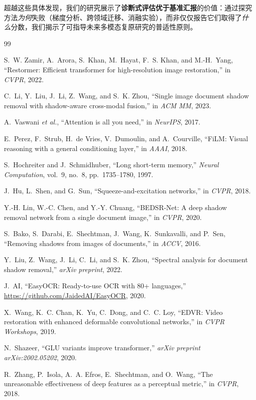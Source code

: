 \documentclass[11pt]{ctexart}
\begin{document}
超越这些具体发现，我们的研究展示了\textbf{诊断式评估优于基准汇报}的价值：通过探究方法\textit{为何}失败（梯度分析、跨领域迁移、消融实验），而非仅仅报告它们取得了\textit{什么}分数，我们揭示了可指导未来多模态复原研究的普适性原则。



\begin{thebibliography}{99}

S.~W. Zamir, A.~Arora, S.~Khan, M.~Hayat, F.~S. Khan, and M.-H.~Yang,
``Restormer: Efficient transformer for high-resolution image restoration,''
in \textit{CVPR}, 2022.

C.~Li, Y.~Liu, J.~Li, Z.~Wang, and S.~K. Zhou,
``Single image document shadow removal with shadow-aware cross-modal fusion,''
in \textit{ACM MM}, 2023.

A.~Vaswani \textit{et al.},
``Attention is all you need,''
in \textit{NeurIPS}, 2017.

E.~Perez, F.~Strub, H.~de Vries, V.~Dumoulin, and A.~Courville,
``FiLM: Visual reasoning with a general conditioning layer,''
in \textit{AAAI}, 2018.

S.~Hochreiter and J.~Schmidhuber,
``Long short-term memory,''
\textit{Neural Computation}, vol.~9, no.~8, pp.~1735--1780, 1997.

J.~Hu, L.~Shen, and G.~Sun,
``Squeeze-and-excitation networks,''
in \textit{CVPR}, 2018.

Y.-H. Lin, W.-C. Chen, and Y.-Y. Chuang,
``BEDSR-Net: A deep shadow removal network from a single document image,''
in \textit{CVPR}, 2020.

S.~Bako, S.~Darabi, E.~Shechtman, J.~Wang, K.~Sunkavalli, and P.~Sen,
``Removing shadows from images of documents,''
in \textit{ACCV}, 2016.

Y.~Liu, Z.~Wang, J.~Li, C.~Li, and S.~K. Zhou,
``Spectral analysis for document shadow removal,''
\textit{arXiv preprint}, 2022.

J.~AI, ``EasyOCR: Ready-to-use OCR with 80+ languages,''
\url{https://github.com/JaidedAI/EasyOCR}, 2020.

X.~Wang, K.~C. Chan, K.~Yu, C.~Dong, and C.~C. Loy,
``EDVR: Video restoration with enhanced deformable convolutional networks,''
in \textit{CVPR Workshops}, 2019.

N.~Shazeer,
``GLU variants improve transformer,''
\textit{arXiv preprint arXiv:2002.05202}, 2020.

R.~Zhang, P.~Isola, A.~A. Efros, E.~Shechtman, and O.~Wang,
``The unreasonable effectiveness of deep features as a perceptual metric,''
in \textit{CVPR}, 2018.

\end{thebibliography}
\end{document}
